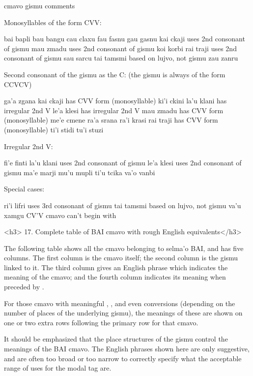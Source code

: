    cmavo   gismu       comments

Monosyllables of the form CVV:

bai bapli
    bau bangu
    cau claxu
    fau fasnu
    gau gasnu
    kai ckaji   uses 2nd consonant of gismu
    mau zmadu   uses 2nd consonant of gismu
    koi korbi
    rai traji   uses 2nd consonant of gismu
    sau sarcu
    tai tamsmi  based on lujvo, not gismu
    zau zanru

Second consonant of the gismu as the C:
        (the gismu is always of the form CCVCV)

ga'a    zgana
    kai ckaji   has CVV form (monosyllable)
    ki'i    ckini
    la'u    klani   has irregular 2nd V
    le'a    klesi   has irregular 2nd V
    mau zmadu   has CVV form (monosyllable)
    me'e    cmene
    ra'a    srana
    ra'i    krasi
    rai traji   has CVV form (monosyllable)
    ti'i    stidi
    tu'i    stuzi

Irregular 2nd V:

fi'e    finti
    la'u    klani   uses 2nd consonant of gismu
    le'a    klesi   uses 2nd consonant of gismu
    ma'e    marji
    mu'u    mupli
    ti'u    tcika
    va'o    vanbi

Special cases:

ri'i    lifri   uses 3rd consonant of gismu
    tai tamsmi  based on lujvo, not gismu
    va'u    xamgu   CV'V cmavo can't begin with 

<h3>
17. Complete table of BAI cmavo with rough English
    equivalents</h3>

The following table shows all the cmavo belonging to selma'o
    BAI, and has five columns. The first column is the cmavo
    itself; the second column is the gismu linked to it. The third
    column gives an English phrase which indicates the meaning of
    the cmavo; and the fourth column indicates its meaning when
    preceded by .

For those cmavo with meaningful , , and even
     conversions (depending on the number of places of the
    underlying gismu), the meanings of these are shown on one or
    two extra rows following the primary row for that cmavo.

It should be emphasized that the place structures of the
    gismu control the meanings of the BAI cmavo. The English
    phrases shown here are only suggestive, and are often too broad
    or too narrow to correctly specify what the acceptable range of
    uses for the modal tag are.

